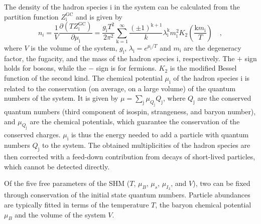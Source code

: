 The density of the hadron species i in the system can be calculated from the partition function $Z_\mathrm{i}^\mathrm{GC}$ and is given by
\begin{equation*}
    n_i = \frac{1}{V} \frac{\partial(TZ_\mathrm{i}^\mathrm{GC})}{\partial\mu_\mathrm{i}} = \frac{g_\mathrm{i}T^2}{2\pi^2}\sum_\mathrm{k=1}^\infty \frac{(\pm1)^\mathrm{k+1}}{k}\lambda_\mathrm{i}^\mathrm{k}m^2_\mathrm{i} K_2\left(\frac{\mathrm{k}m_\mathrm{i}}{T}\right) \quad ,
\end{equation*}
where $V$ is the volume of the system, $g_\mathrm{i}$, $\lambda_\mathrm{i} = e^{\mu_\mathrm{i}/T}$ and $m_\mathrm{i}$ are the degeneracy factor, the fugacity, and the mass of the hadron species i, respectively. The $+$ sign holds for bosons, while the $-$ sign is for fermions. $K_2$ is the modified Bessel function of the second kind. The chemical potential $\mu_\mathrm{i}$ of the hadron species i is related to the conservation (on average, on a large volume) of the quantum numbers of the system. It is given by $\mu = \sum_\mathrm{j} \mu_{Q_\mathrm{j}}  Q_\mathrm{j}$, where $Q_\mathrm{j}$ are the conserved quantum numbers (third component of isospin, strangeness, and baryon number), and $\mu_{Q_\mathrm{j}}$ are the chemical potentials, which guarantee the conservation of the conserved charges. $\mu_\mathrm{i}$ is thus the energy needed to add a particle with quantum numbers $Q_\mathrm{j}$ to the system. The obtained multiplicities of the hadron species are then corrected with a feed-down contribution from decays of short-lived particles, which cannot be detected directly.

Of the five free parameters of the SHM ($T$, $\mu_{B}$, $\mu_{s}$, $\mu_{I_\mathrm{3}}$, and $V$), two can be fixed through conservation of the initial state quantum numbers. Particle abundances are typically fitted in terms of the temperature $T$, the baryon chemical potential $\mu_{B}$ and the volume of the system $V$. 

